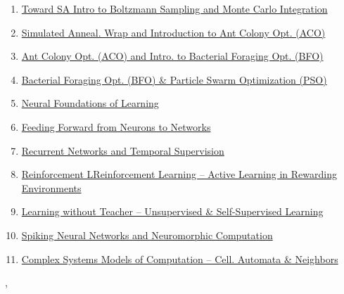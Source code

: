 \documentclass[11pt]{article}
\renewcommand{\today}{\shortmonthname[\the\month] \the \day,  \the\year}
\begin{document}
\begin{enumerate}
	\item \href{https://mp.weixin.qq.com/s/_l9Ey781CjJ7QdV1iwtXhA}{Toward SA Intro to Boltzmann Sampling and Monte Carlo Integration}	%
	\item \href{https://mp.weixin.qq.com/s/27iF9FS3a8bAnLGqp4HqpA}{Simulated Anneal. Wrap and Introduction to Ant Colony Opt. (ACO)}	%
	\item \href{https://mp.weixin.qq.com/s/_a9iHXm7ppoFsELeJb9wxA}{Ant Colony Opt. (ACO) and Intro. to Bacterial Foraging Opt. (BFO)}	%
	\item \href{https://mp.weixin.qq.com/s/gn-_7Cy7JhAnndM36uBJTg}{Bacterial Foraging Opt. (BFO) \& Particle Swarm Optimization (PSO)}	%
	\item \href{https://mp.weixin.qq.com/s/RT9AZ8Gqdp6uciPuQ3yPzw}{Neural Foundations of Learning}	%
	\item \href{https://mp.weixin.qq.com/s/HzLulGA62P3o\_EBYsIaHDw}{Feeding Forward from Neurons to Networks}	%
	\item \href{https://mp.weixin.qq.com/s/_yol_uoM-5Y17P6wfuI6tA}{Recurrent Networks and Temporal Supervision}	%
	\item \href{https://mp.weixin.qq.com/s/XxRG-uoKGLjHU-w44hxpog}{Reinforcement LReinforcement Learning – Active Learning in Rewarding Environments}	%
	\item \href{https://mp.weixin.qq.com/s/LdX0tIFQJLMMNIN2WCH1-Q}{Learning without Teacher – Unsupervised \& Self-Supervised Learning}	%
	\item \href{https://mp.weixin.qq.com/s/1dLRyVS6S9GmZC5M7GoxOQ}{Spiking Neural Networks and Neuromorphic Computation}	%
	\item \href{https://mp.weixin.qq.com/s/dOxYHxDMNWwicQn6ccgW8g}{Complex Systems Models of Computation – Cell. Automata \& Neighbors}	%
\end{enumerate}





%
\begin{flushright}
	\tiny \today 
\end{flushright}
\end{document}
